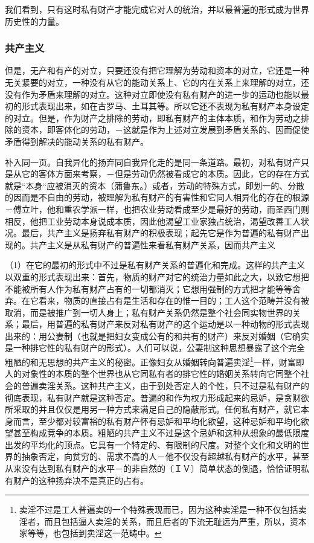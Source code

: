 \documentclass[a4paper,twoside,12pt,AutoFakeBold]{ctexart}
\begin{document}
我们看到，只有这时私有财产才能完成它对人的统治，并以最普遍的形式成为世界历史性的力量。

\subsubsection{共产主义}
但是，无产和有产的对立，只要还没有把它理解为劳动和资本的对立，它还是一种无关紧要的对立，一种没有从它的能动关系上、它的内在关系上来理解的对立，还没有作为矛盾来理解的对立。这种对立即使没有私有财产的进一步的运动也能以最初的形式表现出来，如在古罗马、土耳其等。所以它还不表现为私有财产本身设定的对立。但是，作为财产之排除的劳动，即私有财产的主体本质，和作为劳动之排除的资本，即客体化的劳动，－这就是作为上述对立发展到矛盾关系的、因而促使矛盾得到解决的能动关系的私有财产。

补入同一页。自我异化的扬弃同自我异化走的是同一条道路。最初，对私有财产只是从它的客体方面来考察，－但是劳动仍然被看成它的本质。因此，它的存在方式就是“本身“应被消灭的资本（蒲鲁东。）或者，劳动的特殊方式，即划一的、分散的因而是不自由的劳动，被理解为私有财产的有害性和它同人相异化的存在的根源－傅立叶，他和重农学派一样，也把农业劳动看成至少是最好的劳动，而圣西门则相反，他把工业劳动本身说成本质，因此他渴望工业家独占统治，渴望改善工人状况。最后，共产主义是扬弃私有财产的积极表现；起先它是作为普遍的私有财产出现的。共产主义是从私有财产的普遍性来看私有财产关系，因而共产主义

（1）在它的最初的形式中不过是私有财产关系的普遍化和完成。这样的共产主义以双重的形式表现出来：首先，物质的财产对它的统治力量如此之大，以致它想把不能被所有人作为私有财产占有的一切都消灭；它想用强制的方式把才能等等舍弃。在它看来，物质的直接占有是生活和存在的惟一目的；工人这个范畴并没有被取消，而是被推广到一切人身上；私有财产关系仍然是整个社会同实物世界的关系；最后，用普遍的私有财产来反对私有财产的这个运动是以一种动物的形式表现出来的：用公妻制（也就是把妇女变成公有的和共有的财产）来反对婚姻（它确实是一种排它性的私有财产的形式）。人们可以说，公妻制这种思想暴露了这个完全粗陋的和无思想的共产主义的秘密。正像妇女从婚姻转向普遍卖淫\footnote{卖淫不过是工人普遍卖的一个特殊表现而已，因为这种卖淫是一种不仅包括卖淫者，而且包括逼人卖淫的关系，而且后者的下流无耻远为严重，所以，资本家等等，也包括到卖淫这一范畴中。}一样，财富即人的对象性的本质的整个世界也从它同私有者的排它性的婚姻关系转向它同整个社会的普遍卖淫关系。这种共产主义，由于到处否定人的个性，只不过是私有财产的彻底表现，私有财产就是这种否定。普遍的和作为权力形成起来的忌妒，是贪财欲所采取的并且仅仅是用另一种方式来满足自己的隐蔽形式。任何私有财产，就它本身而言，至少都对较富裕的私有财产怀有忌妒和平均化欲望，这种忌妒和平均化欲望甚至构成竞争的本质。粗陋的共产主义不过是这个忌妒和这种从想象的最低限度出发的平均化的顶点。它具有一个特定的、有限制的尺度。对整个文化和文明的世界的抽象否定，向贫穷的、需求不高的人－他不仅没有超越私有财产的水平，甚至从来没有达到私有财产的水平－的非自然的〔ＩＶ〕简单状态的倒退，恰恰证明私有财产的这种扬弃决不是真正的占有。
\end{document}
